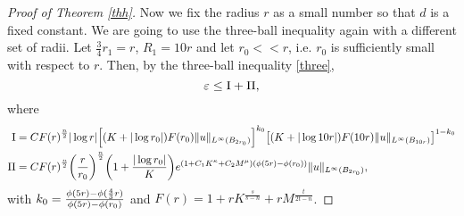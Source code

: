 \documentclass[11pt]{amsart}
\theoremstyle{plain}
\numberwithin{equation}{section}
\begin{document}
\begin{proof} [Proof of Theorem  \ref{thh}]
Now we fix the radius $r$ as a small number so that $d$ is a fixed constant.
We are going to use the three-ball inequality again with a different set of radii.
Let $\frac{3}{4}r_1=r$, $R_1=10r$ and let $r_0 << r$, i.e. $r_0$ is sufficiently small with respect to $r$.
Then, by the three-ball inequality \eqref{three},
$$ {\varepsilon} \leq {\rm I} +\Pi,$$
where
\begin{align*}
{\rm I} &= C F{\left( {r} \right) }^{\frac n 2}  |\log r| {\left[{ (K+|\log r_0|)
F{\left( {r_0} \right) } \|u\|_{L^{\infty}(B_{2r_0})}}\right]}^{k_0} {\left[{ (K+|\log
10r|) F{\left( {10 r} \right) } \|u\|_{L^{\infty}(B_{10 r})}}\right]}^{1 - k_0} \\
\Pi &= C F{\left( {r} \right) }^{\frac n 2} {\left( {\frac{r }{r_0 }} \right) }^{\frac n 2} {\left( {1
+\frac{|\log r_0|}{K}} \right) } e^{{\left( {1 + C_1 K^\kappa + C_2 M^\mu} \right) }
{\left( {\phi{\left( {5r} \right) }-\phi(r_0)} \right) }} \|u\|_{L^{\infty}(B_{2r_0})},
\end{align*}
with ${\displaystyle} k_0 = \frac{\phi(5r)-\phi(\frac 4 3 r)}{\phi(5r)-\phi(r_0)}$ and $F{\left( {r} \right) } = 1 + r K^{\frac{s}{s-n}} + r M^{\frac{t}{2t-n}}$.


\end{proof}
\end{document}
